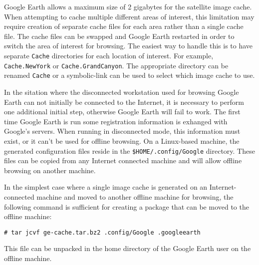 Google Earth allows a maximum size of 2 gigabytes for the satellite image cache.
When attempting to cache multiple different areas of interest, this limitation
may require creation of separate cache files for each area rather than a single
cache file.  The cache files can be swapped and Google Earth restarted in order
to switch the area of interest for browsing.  The easiest way to handle this is
to have separate {\tt Cache} directories for each location of interest.  For
example, {\tt Cache.NewYork} or {\tt Cache.GrandCanyon}.  The appropriate
directory can be renamed {\tt Cache} or a symbolic-link can be used to select
which image cache to use.

In the sitation where the disconnected workstation used for browsing Google
Earth can not initially be connected to the Internet, it is necessary to perform
one additional initial step, otherwise Google Earth will fail to work.  The
first time Google Earth is run some registration information is exhanged with
Google's servers.  When running in disconnected mode, this information must
exist, or it can't be used for offline browsing.  On a Linux-based machine, the
generated configuration files reside in the {\tt \$HOME\slash .config\slash Google}
directory.  These files can be copied from any Internet connected machine and
will allow offline browsing on another machine.

In the simplest case where a single image cache is generated on an
Internet-connected machine and moved to another offline machine for browsing,
the following command is sufficient for creating a package that can be moved to
the offline machine:

{\tt \# tar jcvf ge-cache.tar.bz2 .config\slash Google .googleearth}

This file can be unpacked in the home directory of the Google Earth user on the
offline machine.
